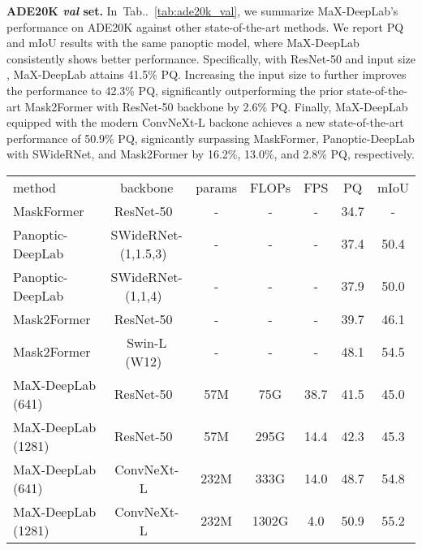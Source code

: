 \documentclass[runningheads]{llncs}
\makeatletter
\DeclareRobustCommand\onedot{\futurelet\@let@token\@onedot}
\def\@onedot{\ifx\@let@token.\else.\null\fi\xspace}
\newcommand{\tabref}[1]{Tab\onedot~\ref{#1}}
\newcommand{\tablestyle}[2]{\setlength{\tabcolsep}{#1}\renewcommand{\arraystretch}{#2}\centering\footnotesize}
\makeatother
\begin{document}
\textbf{ADE20K \textit{val} set.}\quad
In~\tabref{tab:ade20k_val}, we summarize MaX-DeepLab's performance on ADE20K against other state-of-the-art methods. We report PQ and mIoU results with the same panoptic model, where MaX-DeepLab consistently shows better performance.
Specifically, with ResNet-50 and input size , MaX-DeepLab attains 41.5\% PQ. Increasing the input size to   further improves the performance to 42.3\% PQ, significantly outperforming the prior state-of-the-art Mask2Former with ResNet-50 backbone by 2.6\% PQ.
Finally, MaX-DeepLab equipped with the modern ConvNeXt-L backone achieves a new state-of-the-art performance of 50.9\% PQ, signicantly surpassing MaskFormer, Panoptic-DeepLab with SWideRNet, and Mask2Former by 16.2\%, 13.0\%, and 2.8\% PQ, respectively.

\begin{table*}[!t]
\centering
\small
\caption{ADE20K \textit{val} set results. Our FLOPs and FPS are evaluated with the input size ( or ) and a Tesla V100-SXM2 GPU. : ImageNet-22K pretraining. The input size for MaX-DeepLab is shown in the parentheses 
}
\tablestyle{1pt}{0.9}
\begin{tabular}{l|c|ccc|cc}
method & backbone & params & FLOPs & FPS & PQ  & mIoU \\
\shline
MaskFormer~\cite{cheng2021per} & ResNet-50~\cite{he2016deep} & - & - & - & 34.7 & - \\
Panoptic-DeepLab~\cite{cheng2019panoptic} & SWideRNet-(1,1.5,3)~\cite{swidernet_2020} & - & - & - & 37.4 & 50.4 \\
Panoptic-DeepLab~\cite{cheng2019panoptic} & SWideRNet-(1,1,4)~\cite{swidernet_2020} & - & - & - & 37.9 & 50.0 \\
Mask2Former~\cite{cheng2021masked} & ResNet-50~\cite{he2016deep} & - & - & - & 39.7 & 46.1 \\
Mask2Former~\cite{cheng2021masked} & Swin-L (W12)~\cite{liu2021swin} & - & - & - & 48.1 & 54.5 \\
\hline \hline
MaX-DeepLab (641) & ResNet-50~\cite{he2016deep} & 57M & 75G & 38.7 & 41.5 & 45.0 \\
MaX-DeepLab (1281) & ResNet-50~\cite{he2016deep} & 57M & 295G & 14.4 & 42.3 & 45.3 \\
MaX-DeepLab (641) & ConvNeXt-L~\cite{liu2022convnet} & 232M & 333G & 14.0 & 48.7 & 54.8 \\
MaX-DeepLab (1281) & ConvNeXt-L~\cite{liu2022convnet} & 232M & 1302G & 4.0 & 50.9 & 55.2 \\
\end{tabular}
\label{tab:ade20k_val}
\end{table*}
\end{document}
